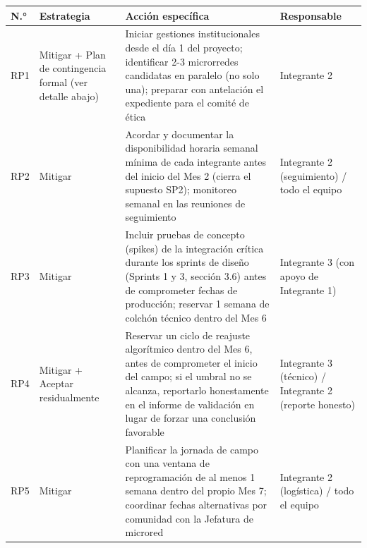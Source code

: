 \documentclass[11pt,a4paper]{article}
\begin{document}
{\small
\begin{longtable}[]{@{}
  >{\raggedright\arraybackslash}p{}
  >{\raggedright\arraybackslash}p{}
  >{\raggedright\arraybackslash}p{}
  >{\raggedright\arraybackslash}p{}@{}}
\toprule\noalign{}
\begin{minipage}[b]{\linewidth}\raggedright
N.°
\end{minipage} & \begin{minipage}[b]{\linewidth}\raggedright
Estrategia
\end{minipage} & \begin{minipage}[b]{\linewidth}\raggedright
Acción específica
\end{minipage} & \begin{minipage}[b]{\linewidth}\raggedright
Responsable
\end{minipage} \\
\midrule\noalign{}
\endhead
\bottomrule\noalign{}
\endlastfoot
RP1 & Mitigar + Plan de contingencia formal (ver detalle abajo) & Iniciar gestiones institucionales desde el día 1 del proyecto; identificar 2-3 microrredes candidatas en paralelo (no solo una); preparar con antelación el expediente para el comité de ética & Integrante 2 \\
RP2 & Mitigar & Acordar y documentar la disponibilidad horaria semanal mínima de cada integrante antes del inicio del Mes 2 (cierra el supuesto SP2); monitoreo semanal en las reuniones de seguimiento & Integrante 2 (seguimiento) / todo el equipo \\
RP3 & Mitigar & Incluir pruebas de concepto (spikes) de la integración crítica durante los sprints de diseño (Sprints 1 y 3, sección 3.6) antes de comprometer fechas de producción; reservar 1 semana de colchón técnico dentro del Mes 6 & Integrante 3 (con apoyo de Integrante 1) \\
RP4 & Mitigar + Aceptar residualmente & Reservar un ciclo de reajuste algorítmico dentro del Mes 6, antes de comprometer el inicio del campo; si el umbral no se alcanza, reportarlo honestamente en el informe de validación en lugar de forzar una conclusión favorable & Integrante 3 (técnico) / Integrante 2 (reporte honesto) \\
RP5 & Mitigar & Planificar la jornada de campo con una ventana de reprogramación de al menos 1 semana dentro del propio Mes 7; coordinar fechas alternativas por comunidad con la Jefatura de microred & Integrante 2 (logística) / todo el equipo \\

\end{longtable}}
\end{document}
